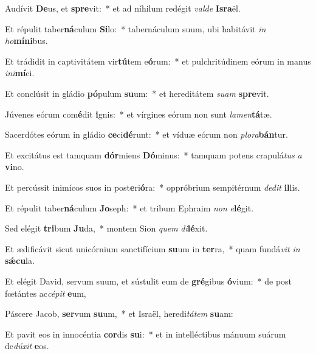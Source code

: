 \item Audívit \textbf{De}us, et \textbf{spre}vit:~* et ad níhilum redégit \textit{val}\textit{de} \textbf{Is}\textbf{ra}ël.
\item Et répulit taber\textbf{ná}culum \textbf{Si}lo:~* tabernáculum suum, ubi habitávit \textit{in} \textit{ho}\textbf{mí}\textbf{ni}bus.
\item Et trádidit in captivitátem vir\textbf{tú}tem e\textbf{ó}rum:~* et pulchritúdinem eórum in manus \textit{in}\textit{i}\textbf{mí}ci.
\item Et conclúsit in gládio \textbf{pó}pulum \textbf{su}um:~* et hereditátem \textit{su}\textit{am} \textbf{spre}vit.
\item Júvenes eórum com\textbf{é}dit \textbf{i}gnis:~* et vírgines eórum non sunt \textit{la}\textit{men}\textbf{tá}tæ.
\item Sacerdótes eórum in gládio \textbf{ce}ci\textbf{dé}runt:~* et víduæ eórum non \textit{plo}\textit{ra}\textbf{bán}tur.
\item Et excitátus est tamquam \textbf{dór}miens \textbf{Dó}minus:~* tamquam potens crapulá\textit{tus} \textit{a} \textbf{vi}no.
\item Et percússit inimícos suos in post\textbf{e}ri\textbf{ó}ra:~* oppróbrium sempitérnum \textit{de}\textit{dit} \textbf{il}lis.
\item Et répulit taber\textbf{ná}culum \textbf{Jo}seph:~* et tribum Ephraim \textit{non} \textit{e}\textbf{lé}git.
\item Sed elégit \textbf{tri}bum \textbf{Ju}da,~* montem Sion \textit{quem} \textit{di}\textbf{lé}xit.
\item Et ædificávit sicut unicórnium sanctifícium \textbf{su}um in \textbf{ter}ra,~* quam fundá\textit{vit} \textit{in} \textbf{sǽ}\textbf{cu}la.
\item Et elégit David, servum suum, et sústulit eum de \textbf{gré}gibus \textbf{ó}vium:~* de post fœtántes ac\textit{cé}\textit{pit} \textbf{e}um,
\item Páscere Jacob, \textbf{ser}vum \textbf{su}um,~* et Israël, heredi\textit{tá}\textit{tem} \textbf{su}am:
\item Et pavit eos in innocéntia \textbf{cor}dis \textbf{su}i:~* et in intelléctibus mánuum suárum de\textit{dú}\textit{xit} \textbf{e}os.
